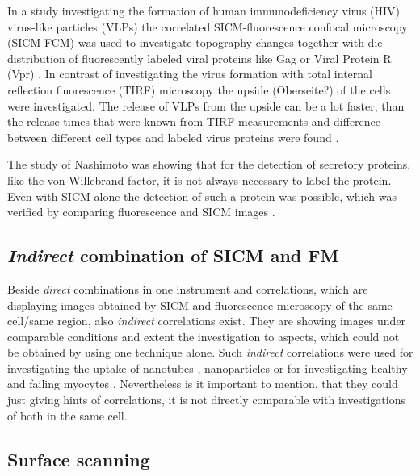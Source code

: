 In a study investigating the formation of human immunodeficiency virus (HIV) virus-like particles 
(VLPs) the correlated SICM-fluorescence confocal microscopy (SICM-FCM) was used to investigate 
topography changes together with die distribution of fluorescently labeled viral proteins like Gag 
or Viral Protein R (Vpr) \cite{Bednarska2020}. In contrast of investigating the virus formation 
with total internal reflection fluorescence (TIRF) microscopy \cite{Jouvenet2008} the upside 
(Oberseite?) of the cells were investigated. The release of VLPs from the upside can be a lot 
faster, than the release times that were known from TIRF measurements and difference between 
different cell types and labeled virus proteins were found \cite{Bednarska2020}. 

The study of Nashimoto was showing that for the detection of secretory proteins, like the von 
Willebrand factor, it is not always necessary to label the protein. Even with SICM alone the 
detection of such a protein was possible, which was verified by comparing fluorescence and SICM 
images \cite{Nashimoto2015}.

\subsection{\emph{Indirect} combination of SICM and FM}


Beside \emph{direct} combinations in one instrument and correlations, which are displaying images 
obtained by SICM and fluorescence microscopy of the same cell/same region, also \emph{indirect} 
correlations exist. They are showing images under comparable conditions and extent the 
investigation to aspects, which could not be obtained by using one technique alone. Such 
\emph{indirect} correlations were used for investigating the uptake of nanotubes \cite{Lee2013}, 
nanoparticles \cite{Gesper2017} or for investigating healthy and failing myocytes \cite{Lyon2009}. 
Nevertheless is it important to mention, that they could just giving hints of correlations, it 
is not directly comparable with investigations of both in the same cell. 

\subsection{Surface scanning}

